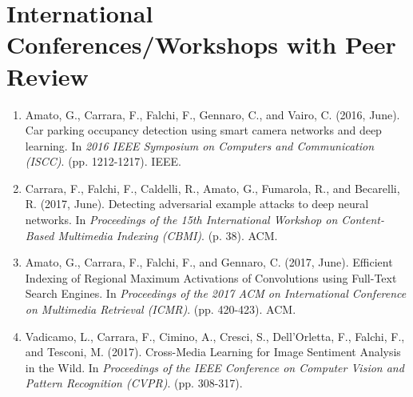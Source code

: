 \section*{International Conferences/Workshops with Peer Review}
\begin{enumerate}
    \item Amato, G., Carrara, F., Falchi, F., Gennaro, C., and Vairo, C. (2016, June). Car parking occupancy detection using smart camera networks and deep learning. In \emph{2016 IEEE Symposium on Computers and Communication (ISCC)}. (pp. 1212-1217). IEEE.
    \item Carrara, F., Falchi, F., Caldelli, R., Amato, G., Fumarola, R., and Becarelli, R. (2017, June). Detecting adversarial example attacks to deep neural networks. In \emph{Proceedings of the 15th International Workshop on Content-Based Multimedia Indexing (CBMI)}. (p. 38). ACM.
    \item Amato, G., Carrara, F., Falchi, F., and Gennaro, C. (2017, June). Efficient Indexing of Regional Maximum Activations of Convolutions using Full-Text Search Engines. In \emph{Proceedings of the 2017 ACM on International Conference on Multimedia Retrieval (ICMR)}. (pp. 420-423). ACM.
    \item Vadicamo, L., Carrara, F., Cimino, A., Cresci, S., Dell’Orletta, F., Falchi, F., and Tesconi, M. (2017). Cross-Media Learning for Image Sentiment Analysis in the Wild. In \emph{Proceedings of the IEEE Conference on Computer Vision and Pattern Recognition (CVPR)}. (pp. 308-317). 
    
\end{enumerate}

